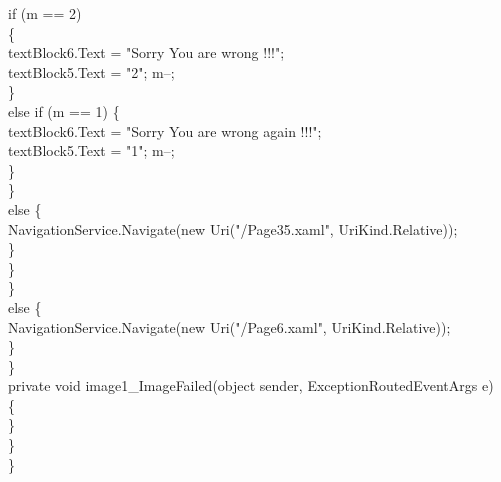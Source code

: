 {{                        if (m == 2)\\
                        \{\\
                            textBlock6.Text = "Sorry You are wrong !!!";\\
                            textBlock5.Text = "2"; m--;\\
                        \}\\
                        else if (m == 1)
                        \{\\
                            textBlock6.Text = "Sorry You are wrong again !!!";\\
                            textBlock5.Text = "1"; m--;\\
                        \}\\
                    \}\\
                    else
                    \{\\
                        NavigationService.Navigate(new Uri("/Page35.xaml", UriKind.Relative));\\
                    \}\\
                \}\\
            \}\\

            else
            \{\\
                NavigationService.Navigate(new Uri("/Page6.xaml", UriKind.Relative));\\
            \}\\
        \}\\
        private void image1_ImageFailed(object sender, ExceptionRoutedEventArgs e)\\
        \{\\

        \}\\
    \}\\
\}\\

}}
